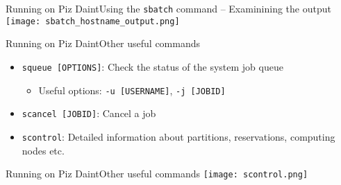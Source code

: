 \begin{frame}[fragile]{Running on Piz Daint}{Using the \texttt{sbatch} command -- Examinining the output}
  {
    \centering
    \texttt{[image: sbatch\_hostname\_output.png]}
  }
\end{frame}

\begin{frame}{Running on Piz Daint}{Other useful commands}
  \begin{itemize}
  \item \texttt{squeue [OPTIONS]}: Check the status of the system job queue
    \begin{itemize}
    \item Useful options: \texttt{-u [USERNAME]}, \texttt{-j [JOBID]}
    \end{itemize}
  \item \texttt{scancel [JOBID]}: Cancel a job
  \item \texttt{scontrol}: Detailed information about partitions, reservations,
    computing nodes etc.
  \end{itemize}
\end{frame}

\begin{frame}{Running on Piz Daint}{Other useful commands}
  {
    \centering
    \texttt{[image: scontrol.png]}
  }
\end{frame}
